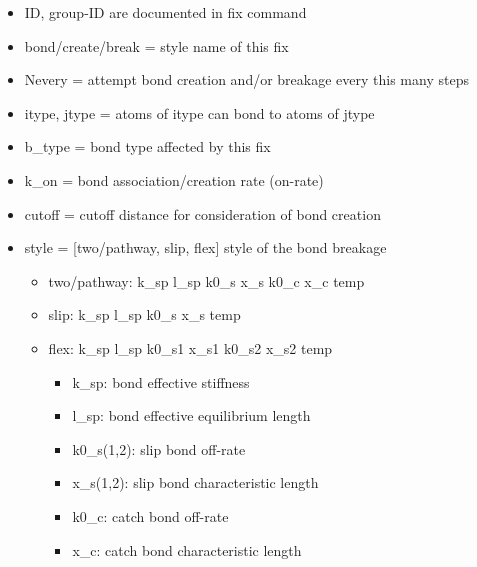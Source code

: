 \begin{itemize}

  \item ID, group-ID are documented in fix command

  \item bond/create/break = style name of this fix

  \item Nevery = attempt bond creation and/or breakage every this many steps

  \item itype, jtype = atoms of itype can bond to atoms of jtype

  \item b\_type = bond type affected by this fix

  \item k\_on = bond association/creation rate (on-rate)

  \item cutoff = cutoff distance for consideration of bond creation

  \item style = [two/pathway, slip, flex] style of the bond breakage

  \begin{itemize}

    \item two/pathway: k\_sp  l\_sp  k0\_s  x\_s  k0\_c  x\_c  temp

    \item slip: k\_sp  l\_sp  k0\_s  x\_s  temp

    \item flex: k\_sp  l\_sp  k0\_s1  x\_s1  k0\_s2  x\_s2  temp

    \begin{itemize}

      \item k\_sp: bond effective stiffness

      \item l\_sp: bond effective equilibrium length

      \item k0\_s(1,2): slip bond off-rate

      \item x\_s(1,2): slip bond characteristic length

      \item k0\_c: catch bond off-rate

      \item x\_c: catch bond characteristic length


\end{itemize}
\end{itemize}
\end{itemize}
